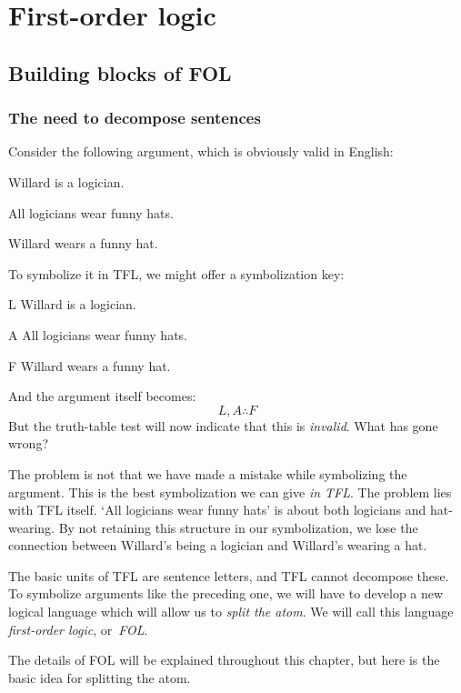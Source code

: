 \part{First-order logic}
\label{ch.FOL}
\chapter{Building blocks of FOL}\label{s:FOLBuildingBlocks}

\section{The need to decompose sentences}
Consider the following argument, which is obviously valid in English:
\begin{earg}
\label{willard1}
\item[] Willard is a logician.
\item[] All logicians wear funny hats.
\item[\texttherefore] Willard wears a funny hat.
\end{earg}
To symbolize it in TFL, we might offer a symbolization key:
\begin{ekey}
\item[L] Willard is a logician.
\item[A] All logicians wear funny hats.
\item[F] Willard wears a funny hat.
\end{ekey}
And the argument itself becomes:
$$L, A \therefore F$$
But the truth-table test will now indicate that this is \emph{invalid}. What has gone wrong?

The problem is not that we have made a mistake while symbolizing the argument. This is the best symbolization we can give \emph{in TFL}. The problem lies with TFL itself. `All logicians wear funny hats' is about both logicians and hat-wearing. By not retaining this structure in our symbolization, we lose the connection between Willard's being a logician and Willard's wearing a hat.

The basic units of TFL are sentence letters, and TFL cannot decompose these. To symbolize arguments like the preceding one, we will have to develop a new logical language which will allow us to \emph{split the atom}. We will call this language \emph{first-order logic}, or~\emph{FOL}.

The details of FOL will be explained throughout this chapter, but here is the basic idea for splitting the atom.

